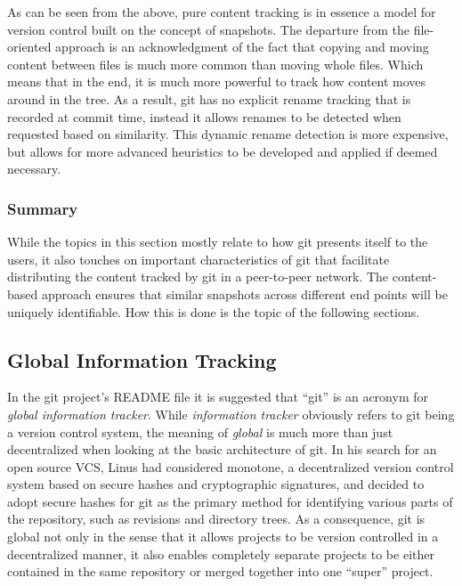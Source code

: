 As can be seen from the above, pure content tracking is in essence a
model for version control built on the concept of snapshots. 
The departure from the file-oriented approach is an acknowledgment of
the fact that copying and moving content between files is much more
common than moving whole files. Which means that in the end, it is
much more powerful to track how content moves around in the tree.  As
a result, git has no explicit rename tracking that is recorded at
commit time, instead it allows renames to be detected when requested
based on similarity. This dynamic rename detection is more expensive,
but allows for more advanced heuristics to be developed and applied if
deemed necessary.


\subsubsection*{Summary}

While the topics in this section mostly relate to how git presents
itself to the users, it also touches on important characteristics
of git that facilitate distributing the content tracked by git in a
peer-to-peer network. The content-based approach ensures that similar
snapshots across different end points will be uniquely identifiable.
How this is done is the topic of the following sections.

\subsection{Global Information Tracking}

In the git project's README file it is suggested that ``git'' is an
acronym for \emph{global information tracker}. While \emph{information
tracker} obviously refers to git being a version control system, the
meaning of \emph{global} is much more than just decentralized when
looking at the basic architecture of git. In his search for an open
source VCS, Linus had considered monotone, a decentralized version
control system based on secure hashes and cryptographic signatures,
and decided to adopt secure hashes for git as the primary method for
identifying various parts of the repository, such as revisions and
directory trees. As a consequence, git is global not only in the sense
that it allows projects to be version controlled in a decentralized
manner, it also enables completely separate projects to be either
contained in the same repository or merged together into one ``super''
project.

